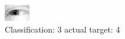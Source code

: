 \begin{figure}[h!]
\begin{center}
\includegraphics[width=0.60\columnwidth]{figures/ID2551_class_3_target_4.png}
\end{center}
\caption{ Classification: 3 actual target: 4}
\label{fig:ID2551_class_3_target_4}
\end{figure}
